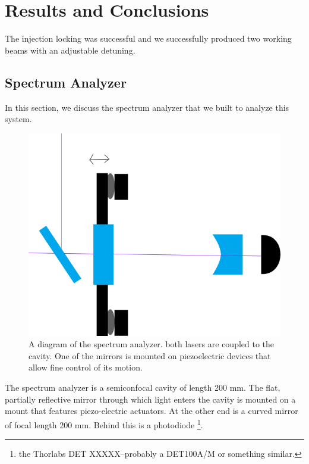 \chapter{Results and Conclusions}

The injection locking was successful and we successfully produced two working beams with an adjustable detuning. 

\section{Spectrum Analyzer}
In this section, we discuss the spectrum analyzer that we built to analyze this system. 

\begin{figure}
    \centerline{\includegraphics[totalheight=0.3\textheight ]{spectrumAnalyzer}}
    \caption[]{\label{fig:spectrumAnalyzer}
    A diagram of the spectrum analyzer. both lasers are coupled to the cavity. One of the mirrors is mounted on piezoelectric devices that allow fine control of its motion. 
}
\end{figure}


The spectrum analyzer is a semiconfocal cavity of length 200 mm. The flat, partially reflective mirror through which light enters the cavity is mounted on a mount that features piezo-electric actuators. At the other end is a curved mirror of focal length 200 mm. Behind this is a photodiode \footnote{the Thorlabs DET XXXXX--probably a DET100A/M or something similar.}.

